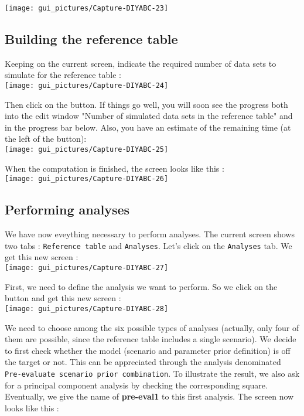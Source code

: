 \texttt{[image: gui\_pictures/Capture-DIYABC-23]}


\subsection{Building the reference table}

Keeping on the current screen, indicate the required number of data
sets to simulate for the reference table : \\


\texttt{[image: gui\_pictures/Capture-DIYABC-24]}

Then click on the  button. If things
go well, you will soon see the progress both into the edit window
"Number of simulated data sets in the reference table"
and in the progress bar below. Also, you have an estimate of the remaining
time (at the left of the  button):\\


\texttt{[image: gui\_pictures/Capture-DIYABC-25]}

When the computation is finished, the screen looks like this :\\


\texttt{[image: gui\_pictures/Capture-DIYABC-26]}


\subsection{Performing analyses}

We have now eveything necessary to perform analyses. The current screen
shows two tabs : \texttt{Reference table} and \texttt{Analyses}. Let's
click on the \texttt{Analyses} tab. We get this new screen :\\


\texttt{[image: gui\_pictures/Capture-DIYABC-27]}

First, we need to define the analysis we want to perform. So we click
on the  button and get this new
screen :\\


\texttt{[image: gui\_pictures/Capture-DIYABC-28]}

We need to choose among the six possible types of analyses (actually,
only four of them are possible, since the reference table includes
a single scenario). We decide to first check whether the model (scenario
and parameter prior definition) is off the target or not. This can
be appreciated through the analysis denominated \texttt{Pre-evaluate
scenario prior combination}. To illustrate the result, we also ask
for a principal component analysis by checking the corresponding square.
Eventually, we give the name of \textbf{pre-eval1} to this first analysis.
The screen now looks like this :\\



